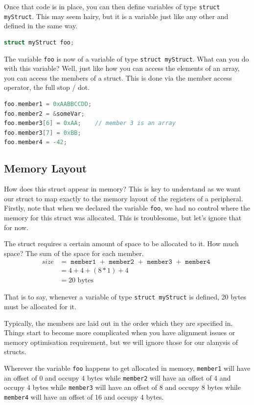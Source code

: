 Once that code is in place, you can then define variables of type \texttt{struct myStruct}. This may seem hairy, but it is a variable just like any other and defined in the same way.

\begin{lstlisting}[language=C]
struct myStruct foo;
\end{lstlisting}

The variable \texttt{foo} is now of a variable of type \texttt{struct myStruct}. What can you do with this variable? Well, just like how you can access the elements of an array, you can access the members of a struct. This is done via the member access operator, the full stop / dot. 

\begin{lstlisting}[language=C]
foo.member1 = 0xAABBCCDD;
foo.member2 = &someVar;
foo.member3[6] = 0xAA;    // member 3 is an array
foo.member3[7] = 0xBB;
foo.member4 = -42;
\end{lstlisting}

\subsection{Memory Layout}
How does this struct appear in memory? This is key to understand as we want our struct to map exactly to the memory layout of the registers of a peripheral. 
Firstly, note that when we declared the variable \texttt{foo}, we had no control where the memory for this struct was allocated. This is troublesome, but let's ignore that for now.

The struct requires a certain amount of space to be allocated to it. How much space? The sum of the space for each member. 
\begin{align*}
size &= \texttt{ member1 } + \texttt{ member2 } + \texttt{ member3 } + \texttt{ member4 }\\
 &= 4 + 4 + (8*1) + 4\\
 &= 20 \text{ bytes}
\end{align*}

That is to say, whenever a variable of type \texttt{struct myStruct} is defined, 20 bytes must be allocated for it. 

Typically, the members are laid out in the order which they are specified in. Things start to become more complicated when you have alignment issues or memory optimisation requirement, but we will ignore those for our alanysis of structs. 

Wherever the variable \texttt{foo} happens to get allocated in memory, \texttt{member1} will have an offset of 0 and occupy 4 bytes while \texttt{member2} will have an offset of 4 and occupy 4 bytes while \texttt{member3} will have an offset of 8 and occupy 8 bytes while \texttt{member4} will have an offset of 16 and occupy 4 bytes. 

